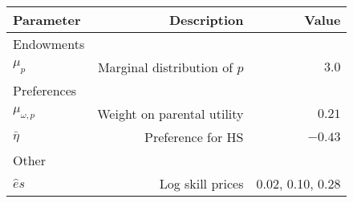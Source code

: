 \begin{tabular}{lrr}
\hline
Parameter & Description  & Value  \\
\hline
Endowments &   &   \\
$\mu_{p}$ & Marginal distribution of $p$  & $3.0$  \\
Preferences &   &   \\
$\mu_{\omega,p}$ & Weight on parental utility  & $0.21$  \\
$\bar{\eta}$ & Preference for HS  & $-0.43$  \\
Other &   &   \\
$\hat{e}{s}$ & Log skill prices  & 0.02, 0.10, 0.28  \\
\hline
\end{tabular}%
